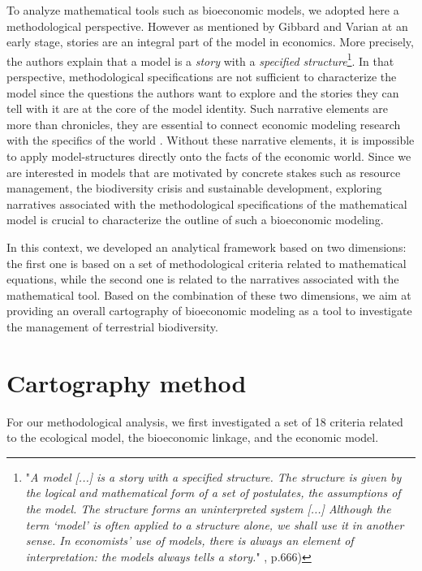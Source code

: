 To analyze  mathematical tools such as bioeconomic models, we adopted here a methodological perspective. However as mentioned by Gibbard and Varian \citep{GibbardVarian} at an early stage, stories are an integral part of the model in economics. More precisely, the authors explain that a model is a \textit{story} with a \textit{specified structure}\footnote{"\textit{A model [...] is a story with a specified structure. The structure is given by the logical and mathematical form of a set of postulates, the assumptions of the model. The structure forms an uninterpreted system [...] Although the term ‘model’ is often applied to a structure alone, we shall use it in another sense. In economists’ use of models, there is always an element of interpretation: the models always tells a story.}" \citep{GibbardVarian}, p.666)}. In that perspective, methodological specifications are not sufficient to  characterize the model since the questions the authors want to explore and the stories they can tell with it are at the core of the model identity. Such narrative elements are more than chronicles, they are essential to connect economic modeling research with the specifics of the world \citep{Morgan}. Without these narrative elements, it is impossible to apply model-structures directly onto the facts of the economic world. Since we are interested in models that are motivated by concrete stakes such as resource management, the biodiversity crisis and sustainable development, exploring narratives associated with the methodological specifications of the mathematical model is crucial to characterize the outline of such a bioeconomic modeling. 

In this context, we developed an analytical framework based on two dimensions: the first one is based on a set of methodological criteria related to mathematical equations, while the second one is related to the narratives associated with the mathematical tool. Based on the combination of these two dimensions, we aim at providing an overall cartography of bioeconomic modeling as a tool to investigate the management of terrestrial biodiversity.

\section{Cartography method}

For our methodological analysis, we first investigated a set of 18 criteria related to the ecological model, the bioeconomic linkage, and the economic model. 

